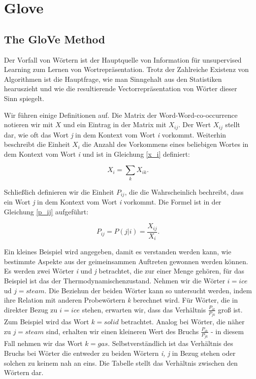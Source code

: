 \chapter{Glove}

\section{The GloVe Method}

Der Vorfall von Wörtern ist der Hauptquelle von Information für unsupervised Learning zum Lernen von Wortrepräsentation. Trotz der Zahlreiche Existenz von Algorithmen ist die Hauptfrage, wie man Sinngehalt aus den Statistiken hearuszieht und wie die resultierende Vectorrepräsentation von Wörter dieser Sinn spiegelt.

Wir führen einige Definitionen auf. Die Matrix der Word-Word-co-occurrence notieren wir mit \textbf{$X$} und ein Eintrag in der Matrix mit \textbf{$X_{ij}$}. Der Wert \textbf{$X_{ij}$} stellt dar, wie oft das Wort \textit{j} in dem Kontext vom Wort \textit{i} vorkommt. Weiterhin beschreibt die Einheit \textbf{$X_i$} die Anzahl des Vorkommens eines beliebigen Wortes in dem Kontext vom Wort \textit{i} und ist in Gleichung \ref{x_i} definiert:

\begin{equation}
	X_i = \sum_{k} X_{ik}.
	\label{x_i}
\end{equation}

Schließlich definieren wir die Einheit \textbf{$P_{ij}$}, die die Wahrscheinlich bechreibt, dass ein Wort \textit{j} in dem Kontext vom Wort \textit{i} vorkommt. Die Formel ist in der Gleichung \ref{p_ij} aufgeführt:

\begin{equation}
	P_{ij} = P(j|i) = \frac{X_{ij}}{X_i}.
	\label{p_ij}
\end{equation}

Ein kleines Beispiel wird angegeben, damit es verstanden werden kann, wie bestimmte Aspekte aus der geimeinsammen Auftreten gewonnen werden können. Es werden zwei Wörter \textit{i} und \textit{j} betrachtet, die zur einer Menge gehören, für das Beispiel ist das der Thermodynamischenzustand. Nehmen wir die Wörter \textit{$i = ice$} ud \textit{$j = steam$}. Die Beziehun der beiden Wörter kann so untersucht werden, indem ihre Relation mit anderen Probewörtern \textit{k} berechnet wird. Für Wörter, die in direkter Bezug zu \textit{$i = ice$} stehen, erwarten wir, dass das Verhältnis $\frac{P_{ik}}{P_{jk}}$ groß ist. Zum Beispiel wird das Wort \textit{$k = solid$} betrachtet. Analog bei Wörter, die näher zu \textit{$j = steam$} sind, erhalten wir einen kleineren Wert des Bruchs $\frac{P_{ik}}{P_{jk}}$ - in diesem Fall nehmen wir das Wort \textit{$k = gas$}. Selbstverständlich ist das Verhältnis des Bruchs bei Wörter die entweder zu beiden Wörtern \textit{i, j} in Bezug stehen oder solchen zu keinem nah an eins. Die Tabelle stellt das Verhältnis zwischen den Wörtern dar.

